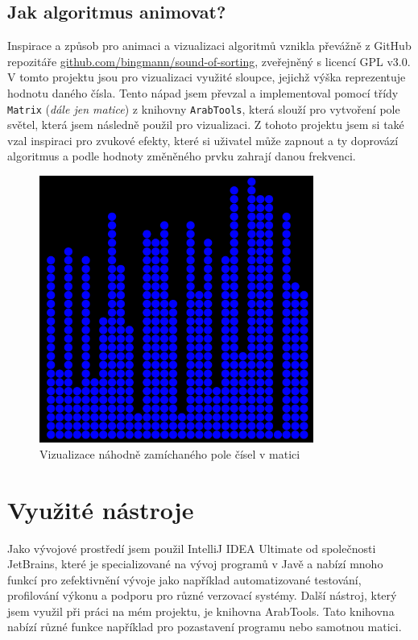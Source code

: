 \documentclass{article}
\begin{document}
\subsection{Jak algoritmus animovat?}
Inspirace a způsob pro animaci a vizualizaci algoritmů vznikla převážně z GitHub repozitáře \href{https://github.com/bingmann/sound-of-sorting}{github.com/bingmann/sound-of-sorting}, zveřejněný s licencí GPL v3.0. V tomto projektu jsou pro vizualizaci využité sloupce, jejichž výška reprezentuje hodnotu daného čísla. Tento nápad jsem převzal a implementoval pomocí třídy \verb|Matrix| (\textit{dále jen matice}) z knihovny \verb|ArabTools|, která slouží pro vytvoření pole světel, která jsem následně použil pro vizualizaci. Z tohoto projektu jsem si také vzal inspiraci pro zvukové efekty, které si uživatel může zapnout a ty doprovází algoritmus a podle hodnoty změněného prvku zahrají danou frekvenci.

\begin{figure}[H]
    \begin{center}
        \includegraphics[width=9cm]{img/matrix_vis.png}
        \caption{Vizualizace náhodně zamíchaného pole čísel v matici}
        \label{imageLabel}
    \end{center}
\end{figure}

\section{Využité nástroje}
Jako vývojové prostředí jsem použil IntelliJ IDEA Ultimate od společnosti JetBrains, které je specializované na vývoj programů v Javě a nabízí mnoho funkcí pro zefektivnění vývoje jako například automatizované testování, profilování výkonu a podporu pro různé verzovací systémy.
Další nástroj, který jsem využil při práci na mém projektu, je knihovna ArabTools. Tato knihovna nabízí různé funkce například pro pozastavení programu nebo samotnou matici.
\end{document}

